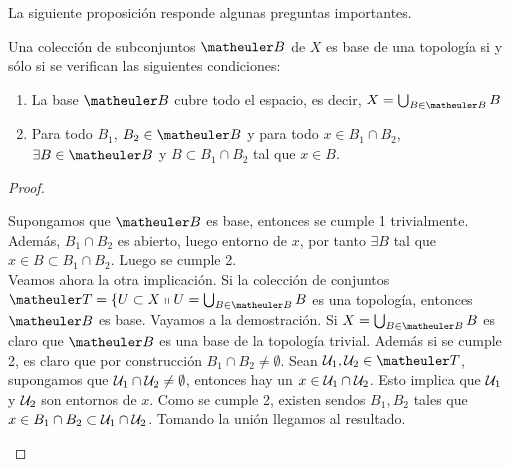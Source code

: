 La siguiente proposición responde algunas preguntas importantes.
\begin{prop}
	\label{etop_base_top}
	Una colección de subconjuntos $\B$ de $X$ es base de una topología si y sólo si se verifican las siguientes condiciones:
	\begin{enumerate}
		\item La base $\B$ cubre todo el espacio, es decir, $X = \bigcup_{B \in \B}B$
		\item Para todo $B_1$, $B_2 \in \B$ y para todo $x \in B_1 \cap B_2$,  $\exists B \in \B$  y  $B \subset B_1 \cap B_2$ tal que $x \in B$.
	\end{enumerate}
\end{prop}
\begin{proof}
	\begin{enumerate}
		Supongamos que $\B$ es base, entonces se cumple 1 trivialmente. Además, $B_1 \cap B_2$ es abierto, luego entorno de $x$, por tanto $\exists B$ tal que $x \in B \subset B_1 \cap B_2$. Luego se cumple 2. \\
		
		Veamos ahora la otra implicación. Si la colección de conjuntos $\T = \{ U \subset X \tq U = \bigcup_{B \in \B}B$ es una topología, entonces $\B$ es base. Vayamos a la demostración. Si $X = \bigcup_{B \in \B}B$ es claro que $\B$ es una base de la topología trivial. Además si se cumple 2, es claro que por construcción $B_1 \cap B_2 \neq \emptyset$. Sean $\U_1, \U_2 \in \T$, supongamos que $\mathcal{U}_1 \cap \mathcal{U}_2 \neq \emptyset$, entonces hay un $x \in \mathcal{U}_1 \cap \mathcal{U}_2$. Esto implica que $\mathcal{U}_1$ y $\mathcal{U}_2$ son entornos de $x$. Como se cumple 2, existen sendos $B_1, B_2$ tales que $x \in B_1 \cap B_2 \subset \mathcal{U}_1 \cap \mathcal{U}_2$. Tomando la unión llegamos al resultado.
	\end{enumerate}
\end{proof}

